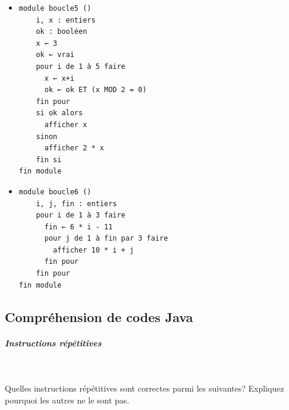 \documentclass[11pt,a4paper]{article}
\begin{document}
\begin{itemize}
			\item \begin{verbatim}
module boucle5 ()
    i, x : entiers
    ok : booléen
    x ← 3
    ok ← vrai
    pour i de 1 à 5 faire
      x ← x+i
      ok ← ok ET (x MOD 2 = 0)
    fin pour
    si ok alors
      afficher x
    sinon
      afficher 2 * x
    fin si
fin module
				\end{verbatim} \textcolor{gray}{\underline{\hspace*{2em}}} 
			\item \begin{verbatim}
module boucle6 ()
    i, j, fin : entiers
    pour i de 1 à 3 faire
      fin ← 6 * i - 11
      pour j de 1 à fin par 3 faire
        afficher 10 * i + j
      fin pour
    fin pour
fin module
				\end{verbatim} \textcolor{gray}{\underline{\hspace*{10em}}} 
					\end{itemize}
				
            \par
        \subsection{Compr\'ehension de codes Java}
			
		\subparagraph{Instructions r\'ep\'etitives} 
		
                \textcolor{white}{.} \par
            
							Quelles instructions r\'ep\'etitives sont correctes parmi les suivantes? 
							Expliquez pourquoi les autres ne le sont pas.
						
\end{document}
